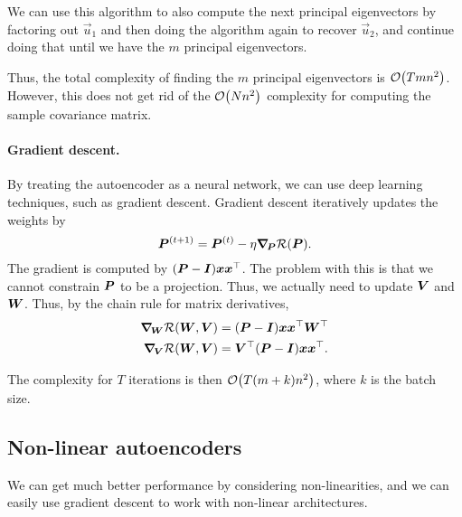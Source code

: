 We can use this algorithm to also compute the next principal eigenvectors by factoring out
$\vec{u}_1$ and then doing the algorithm again to recover $\vec{u}_2$, and continue doing that
until we have the $m$ principal eigenvectors.

Thus, the total complexity of finding the $m$ principal eigenvectors is $\bigo{Tmn^2}$. However,
this does not get rid of the $\bigo{N n^2}$ complexity for computing the sample covariance matrix.

\paragraph{Gradient descent.}

By treating the autoencoder as a neural network, we can use deep learning techniques, such as
gradient descent. Gradient descent iteratively updates the weights by \[
    \mat{P}^{(t+1)} = \mat{P}^{(t)} - \eta \grad{\mathcal{R}(\mat{P})}{\mat{P}}.
\]
The gradient is computed by $(\mat{P} - \mat{I})\vec{x}\transpose{\vec{x}}$. The problem with this
is that we cannot constrain $\mat{P}$ to be a projection. Thus, we actually need to update
$\mat{V}$ and $\mat{W}$. Thus, by the chain rule for matrix derivatives,
\begin{align*}
    \grad{\mathcal{R}(\mat{W}, \mat{V})}{\mat{W}} & = (\mat{P} - \mat{I}) \vec{x} \transpose{\vec{x}} \transpose{\mat{W}}  \\
    \grad{\mathcal{R}(\mat{W}, \mat{V})}{\mat{V}} & = \transpose{\mat{V}} (\mat{P} - \mat{I}) \vec{x} \transpose{\vec{x}}.
\end{align*}

The complexity for $T$ iterations is then $\bigo{T(m+k)n^2}$, where $k$ is the batch size.

\subsection{Non-linear autoencoders}

We can get much better performance by considering non-linearities, and we can easily use gradient
descent to work with non-linear architectures.
